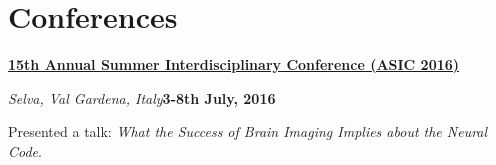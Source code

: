 % 
% 
% 
% 
% 

\section{Conferences}


\href{http://www.cogs.indiana.edu/asic/2016/index.shtml}{\textbf{ 15th Annual Summer Interdisciplinary Conference (ASIC 2016)}}



\begin{outerlist}
\item[] \textit{Selva, Val Gardena, Italy}\hfill\textbf{3-8th July, 2016}

\begin{innerlist}
\item Presented a talk: \textit{What the Success of Brain Imaging Implies about the Neural Code}.
\end{innerlist}

\end{outerlist}
\blankline

